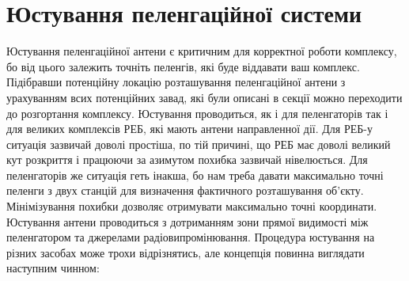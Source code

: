 \documentclass{article}
\begin{document}
\section{Юстування пеленгаційної системи}

Юстування пеленгаційної антени є критичним для корректної роботи комплексу, бо від цього залежить точніть пеленгів, які буде віддавати ваш комплекс. Підібравши потенційну локацію розташування пеленгаційної антени з урахуванням всих потенційних завад, які були описані в секції  можно переходити до розгортання комплексу. Юстування проводиться, як і для пеленгаторів так і для великих комплексів РЕБ, які мають антени направленної дії. Для РЕБ-у ситуація зазвичай доволі простіша, по тій причині, що РЕБ має доволі великий кут розкриття і працюючи за азимутом похибка зазвичай нівелюється. Для пеленгаторів же ситуація геть інакша, бо нам треба давати максимально точні пеленги з двух станцій для визначення фактичного розташування об'єкту. Мінімізування похибки дозволяє отримувати максимально точні координати. Юстування антени проводиться з дотриманням зони прямої видимості між пеленгатором та джерелами радіовипромінювання. Процедура юстування на різних засобах може трохи відрізнятись, але концепція повинна виглядати наступним чинном:
\end{document}
